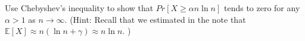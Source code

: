 \documentclass[11pt]{article}
\newif\ifsolutions
\begin{document}
\begin{enumerate}
\begin{enumerate}[a)]
 Use Chebyshev's inequality to show that $Pr[ X \geq \alpha n
  \ln{n}]$ tends to zero for any $\alpha > 1$ as $n \rightarrow
  \infty$. (Hint: Recall that we estimated in the note that
  $\mathbb{E}[X] \approx n(\ln{n} + \gamma) \approx n \ln{n}$. ) 

\ifsolutions{\color{blue}{ FIX THESE
\begin{align*}
Pr[ X \geq n^{3/2} + n\ln{n}] &\approx Pr[ X \geq n^{3/2} + \mathbb{E}[X]] \\ 
&=  Pr[ X - \mathbb{E}[X] \geq n^{3/2} ] \\
&\leq Pr[ | X - \mathbb{E}[X] | \geq n^{3/2} ] \\
&\leq \frac{Var[X]}{n^3} \\
&\leq \frac{2n^2}{n^3} \\
&= \frac{2}{n}
\end{align*}
}}\fi


\end{enumerate}


\end{enumerate}
\end{document}
